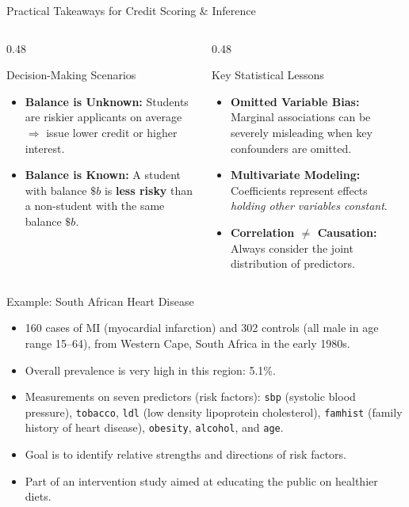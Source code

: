 \documentclass[aspectratio=169, 11pt]{beamer}
\begin{document}
\begin{frame}{Practical Takeaways for Credit Scoring \& Inference}
\begin{columns}[T]
    \begin{column}{0.48\textwidth}
        \begin{block}{Decision-Making Scenarios}
            \begin{itemize}
                \item \textbf{Balance is Unknown:}
                Students are riskier applicants on average $\Rightarrow$ issue lower credit or higher interest.
                \item \textbf{Balance is Known:}
                A student with balance $\$b$ is \textbf{less risky} than a non-student with the same balance $\$b$.
            \end{itemize}
        \end{block}
    \end{column}

    \begin{column}{0.48\textwidth}
        \begin{block}{Key Statistical Lessons}
            \begin{itemize}
                \item \textbf{Omitted Variable Bias:} Marginal associations can be severely misleading when key confounders are omitted.
                \item \textbf{Multivariate Modeling:} Coefficients represent effects \emph{holding other variables constant}.
                \item \textbf{Correlation $\neq$ Causation:} Always consider the joint distribution of predictors.
            \end{itemize}
        \end{block}
    \end{column}
\end{columns}
\end{frame}

\begin{frame}{Example: South African Heart Disease}
  \begin{itemize}
    \item 160 cases of MI (myocardial infarction) and 302 controls (all male in age range 15--64), from Western Cape, South Africa in the early 1980s.
    \item Overall prevalence is very high in this region: 5.1\%.
    \item Measurements on seven predictors (risk factors): \texttt{sbp} (systolic blood pressure), \texttt{tobacco}, \texttt{ldl} (low density lipoprotein cholesterol), \texttt{famhist} (family history of heart disease), \texttt{obesity}, \texttt{alcohol}, and \texttt{age}.
    \item Goal is to identify relative strengths and directions of risk factors.
    \item Part of an intervention study aimed at educating the public on healthier diets.
  \end{itemize}
\end{frame}
\end{document}
